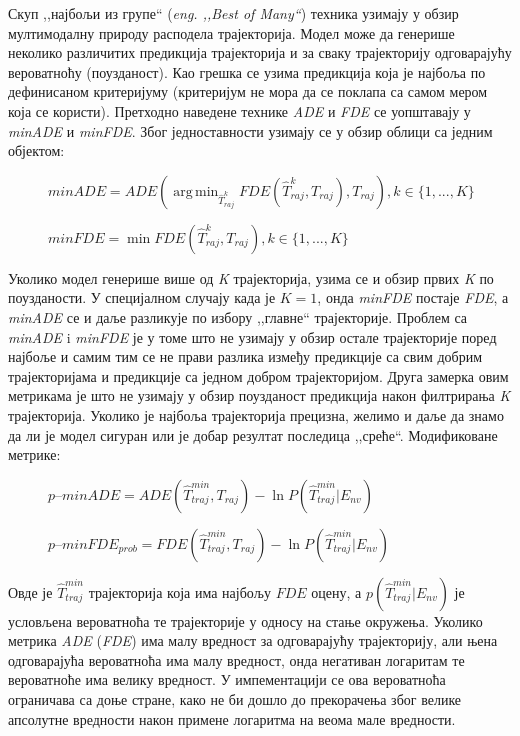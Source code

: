 \documentclass[11pt,oneside]{memoir}
\DeclareMathOperator*{\argmin}{arg\,min}
\begin{document}
Скуп ,,најбољи из групе`` (\textit{eng. ,,Best of Many``}) техника узимају у обзир мултимодалну природу расподела трајекторија. Модел може
да генерише неколико различитих предикција трајекторија и за сваку трајекторију одговарајућу вероватноћу (поузданост). Као грешка се узима предикција
која је најбоља по дефинисаном критеријуму (критеријум не мора да се поклапа са самом мером која се користи). \cite{best_of_many_cvae} \cite{argoverse}
Претходно наведене технике \textit{ADE} и \textit{FDE} се уопштавају у \textit{minADE} и \textit{minFDE}. Због једноставности узимају се у обзир облици
са једним објектом: \cite{Disdis} \cite{best_of_many_cvae}

\begin{figure}[h!]
  \centering
  $minADE = ADE(\displaystyle\argmin_{\hat{T}^k_{raj}} FDE(\hat{T}^k_{raj}, T_{raj}), T_{raj}), k \in \{1, ..., K\}$ 
\end{figure}

\begin{figure}[h!]
  \centering
  $minFDE = \displaystyle\min FDE(\hat{T}^k_{raj}, T_{raj}), k \in \{1, ..., K\}$
\end{figure}

Уколико модел генерише више од \textit{K} трајекторија, узима се и обзир првих \textit{K} по поузданости. У специјалном случају када је $K = 1$, онда 
\textit{minFDE} постаје \textit{FDE}, а \textit{minADE} се и даље разликује по избору ,,главне`` трајекторије. 
Проблем са \textit{minADE} i \textit{minFDE} је у томе што не узимају у обзир остале трајекторије поред најбоље и самим тим се не прави разлика
између предикције са свим добрим трајекторијама и предикције са једном добром трајекторијом. \cite{Disdis} 
Друга замерка овим метрикама је што не узимају у обзир поузданост предикција након филтрирања \textit{K} трајекторија. Уколико је најбоља трајекторија
прецизна, желимо и даље да знамо да ли је модел сигуран или је добар резултат последица ,,среће``. Модификоване метрике: \cite{home}

\begin{figure}[h!]
  \centering
  $p\mbox{--}minADE = ADE(\hat{T}^{min}_{traj}, T_{raj}) - \ln{P(\hat{T}^{min}_{traj}|E_{nv})}$
\end{figure}

\begin{figure}[h!]
  \centering
  $p\mbox{--}minFDE_{prob} = FDE(\hat{T}^{min}_{traj}, T_{raj}) - \ln{P(\hat{T}^{min}_{traj}|E_{nv})}$
\end{figure}

Овде је $\hat{T}^{min}_{traj}$ трајекторија која има најбољу $FDE$ оцену, а $p(\hat{T}^{min}_{traj}|E_{nv})$ је условљена вероватноћа те 
трајекторије у односу на стање окружења. Уколико метрика \textit{ADE} (\textit{FDE}) има малу вредност за одговарајућу трајекторију, али њена одговарајућа вероватноћа има малу вредност, 
онда негативан логаритам те вероватноће има велику вредност. \cite{argoverse} У импементацији се ова вероватноћа ограничава са доње стране, како не
би дошло до прекорачења због велике апсолутне вредности након примене логаритма на веома мале вредности.
\end{document}
